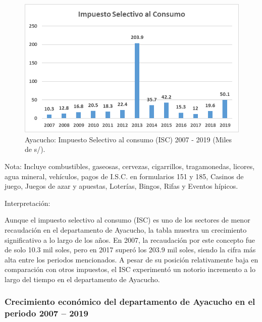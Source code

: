 \documentclass[
  letterpaper,
]{article}
\begin{document}
\begin{figure}

\caption{\label{fig-3}Ayacucho: Impuesto Selectivo al consumo (ISC) 2007
- 2019 (Miles de s/).}

{\centering \includegraphics{20230603225455.png}

}

\end{figure}

Nota: Incluye combustibles, gaseosas, cervezas, cigarrillos,
tragamonedas, licores, agua mineral, vehículos, pagos de I.S.C. en
formularios 151 y 185, Casinos de juego, Juegos de azar y apuestas,
Loterías, Bingos, Rifas y Eventos hípicos.

Interpretación:

Aunque el impuesto selectivo al consumo (ISC) es uno de los sectores de
menor recaudación en el departamento de Ayacucho, la tabla muestra un
crecimiento significativo a lo largo de los años. En 2007, la
recaudación por este concepto fue de solo 10.3 mil soles, pero en 2017
superó los 203.9 mil soles, siendo la cifra más alta entre los periodos
mencionados. A pesar de su posición relativamente baja en comparación
con otros impuestos, el ISC experimentó un notorio incremento a lo largo
del tiempo en el departamento de Ayacucho.

\hypertarget{crecimiento-econuxf3mico-del-departamento-de-ayacucho-en-el-periodo-2007-2019}{%
\subsubsection{Crecimiento económico del departamento de Ayacucho en el
periodo 2007 --
2019}\label{crecimiento-econuxf3mico-del-departamento-de-ayacucho-en-el-periodo-2007-2019}}
\end{document}
